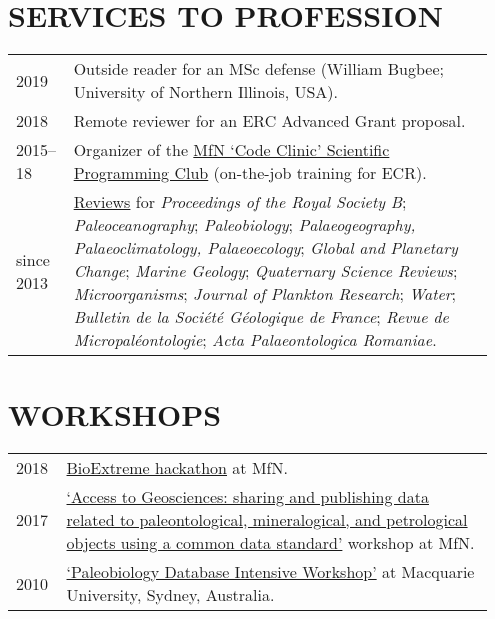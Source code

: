 \documentclass[11pt, a4paper]{article}
\begin{document}
\section{SERVICES TO PROFESSION}
\begin{longtable}{p{0.1\linewidth} P{0.85\linewidth}}
2019 & Outside reader for an MSc defense (William Bugbee; University of Northern Illinois, USA).\\
2018 & Remote reviewer for an ERC Advanced Grant proposal.\\
2015--18 & Organizer of the \href{https://github.com/plannapus/MfN-Code-Clinic}{MfN `Code Clinic' Scientific Programming Club} (on-the-job training for ECR). \\
since 2013 & \href{http://publons.com/a/1291154/}{Reviews} for \textit{Proceedings of the Royal Society B}; \textit{Paleoceanography}; \textit{Paleobiology}; \textit{Palaeo\-geography, Palaeo\-climatology, Palaeo\-ecology}; \textit{Global and Planetary Change}; \textit{Marine Geology}; \textit{Quaternary Science Reviews}; \textit{Microorganisms}; \textit{Journal of Plankton Research}; \textit{Water}; \textit{Bulletin de la Soci\'{e}t\'{e} G\'{e}ologique de France}; \textit{Revue de Micropal\'{e}ontologie}; \textit{Acta Palaeontologica Romaniae}. \\
\end{longtable}

\section{WORKSHOPS}
\begin{longtable}{p{0.1\linewidth} P{0.85\linewidth}}
2018 & \href{https://github.com/macroecology/BioExtremes}{BioExtreme hackathon} at MfN.\\
2017 & \href{https://abcd.biowikifarm.net/wiki/Events:WorkshopEFG2017}{`Access to Geosciences: sharing and publishing data related to paleontological, mineralogical, and petrological objects using a common data standard'} workshop at MfN.\\
2010 & \href{http://fossilworks.org/?page=workshop}{`Paleobiology Database Intensive Workshop'} at Macquarie University, Sydney, Australia.\\
\end{longtable}
\end{document}
